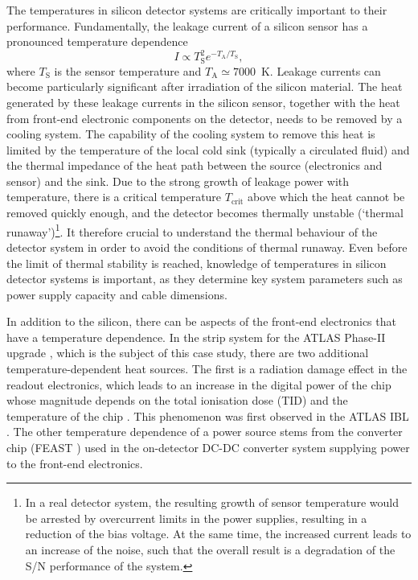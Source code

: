 The temperatures in silicon detector systems are critically important to their performance. Fundamentally, the leakage current of a silicon sensor has a pronounced temperature dependence 
\begin{equation}
I\propto T_\text{S}^2e^{-T_\text{A}/T_\text{S}},
\label{eq:leakage_current_temp_dependence}
\end{equation}
where $T_\text{S}$ is the sensor temperature and $T_\text{A}\simeq7000$~K. Leakage currents can become particularly significant after irradiation of the silicon material. The heat generated by these leakage currents in the silicon sensor, together with the heat from front-end electronic components on the detector, needs to be removed by a cooling system. The capability of the cooling system to remove this heat is limited by the temperature of the local cold sink (typically a circulated fluid) and the thermal impedance of the heat path between the source (electronics and sensor) and the sink. Due to the strong growth of leakage power with temperature, there is a critical temperature $T_\text{crit}$ above which the heat cannot be removed quickly enough, and the detector becomes thermally unstable (`thermal runaway')\footnote{In a real detector system, the resulting growth of sensor temperature would be arrested by overcurrent limits in the power supplies, resulting in a reduction of the bias voltage. At the same time, the increased current leads to an increase of the noise, such that the overall result is a degradation of the S/N performance of the system.}. It therefore crucial to understand the thermal behaviour of the detector system in order to avoid the conditions of thermal runaway. Even before the limit of thermal stability is reached, knowledge of temperatures in silicon detector systems is important, as they determine
key system parameters such as power supply capacity and cable dimensions.

In addition to the silicon,
there can be aspects of the front-end electronics that have a temperature dependence. In the strip system for the ATLAS Phase-II upgrade \cite{Collaboration:2017mtb}, which is the subject of this case study, there are two additional temperature-dependent heat sources. The first is a radiation damage effect in the readout electronics, which leads to an increase in the digital power of the chip whose magnitude depends on the total ionisation dose (TID) and the temperature of the chip \cite{Collaboration:2017mtb}. This phenomenon was first observed in the ATLAS IBL \cite{ATL-INDET-PUB-2017-001}. The other temperature dependence of a power source stems from the converter chip (FEAST \cite{1748-0221-6-11-C11035}) used in the on-detector DC-DC converter system supplying power to the front-end electronics. 


